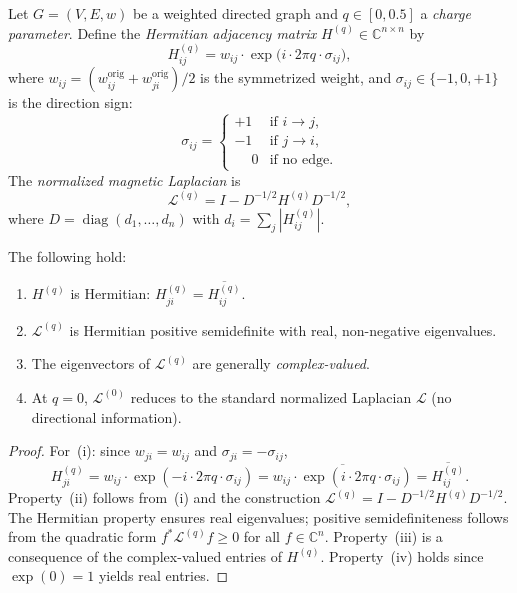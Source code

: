\documentclass[twoside,11pt]{article}
\DeclareMathOperator{\diag}{diag}
\newcommand{\C}{\mathbb{C}}
\begin{document}
\begin{definition}
\label{def:magnetic-laplacian}
Let $G=(V,E,w)$ be a weighted directed graph and $q\in[0,0.5]$ a
\emph{charge parameter}.  Define the \emph{Hermitian adjacency matrix}
$H^{(q)}\in\C^{n\times n}$ by
\begin{equation}
\label{eq:hermitian-adj}
  H^{(q)}_{ij} = w_{ij}\cdot\exp\!\bigl(i\cdot 2\pi q\cdot\sigma_{ij}\bigr),
\end{equation}
where $w_{ij}=(w^{\mathrm{orig}}_{ij}+w^{\mathrm{orig}}_{ji})/2$ is the
symmetrized weight, and $\sigma_{ij}\in\{-1,0,+1\}$ is the direction sign:
\[
  \sigma_{ij} =
  \begin{cases}
    +1 & \text{if } i\to j,\\
    -1 & \text{if } j\to i,\\
    \phantom{+}0 & \text{if no edge}.
  \end{cases}
\]
The \emph{normalized magnetic Laplacian} is
\begin{equation}
\label{eq:magnetic-laplacian}
  \mathcal{L}^{(q)} = I - D^{-1/2}H^{(q)}D^{-1/2},
\end{equation}
where $D=\diag(d_1,\dots,d_n)$ with $d_i=\sum_j|H^{(q)}_{ij}|$.
\end{definition}

\begin{proposition}
\label{prop:magnetic-props}
The following hold:
\begin{enumerate}
\item[\emph{(i)}] $H^{(q)}$ is Hermitian:
  $H^{(q)}_{ji}=\overline{H^{(q)}_{ij}}$.
\item[\emph{(ii)}] $\mathcal{L}^{(q)}$ is Hermitian positive semidefinite
  with real, non-negative eigenvalues.
\item[\emph{(iii)}] The eigenvectors of $\mathcal{L}^{(q)}$ are generally
  \emph{complex-valued}.
\item[\emph{(iv)}] At $q=0$, $\mathcal{L}^{(0)}$ reduces to the standard
  normalized Laplacian $\mathcal{L}$ (no directional information).
\end{enumerate}
\end{proposition}

\begin{proof}
For~(i): since $w_{ji}=w_{ij}$ and $\sigma_{ji}=-\sigma_{ij}$,
\[
  H^{(q)}_{ji} = w_{ij}\cdot\exp(-i\cdot2\pi q\cdot\sigma_{ij})
  = \overline{w_{ij}\cdot\exp(i\cdot2\pi q\cdot\sigma_{ij})}
  = \overline{H^{(q)}_{ij}}.
\]
Property~(ii) follows from~(i) and the construction
$\mathcal{L}^{(q)}=I-D^{-1/2}H^{(q)}D^{-1/2}$.  The Hermitian property
ensures real eigenvalues; positive semidefiniteness follows from the
quadratic form $f^*\mathcal{L}^{(q)}f\ge 0$ for all $f\in\C^n$.
Property~(iii) is a consequence of the complex-valued entries of
$H^{(q)}$.  Property~(iv) holds since $\exp(0)=1$ yields real entries.
\end{proof}
\end{document}
